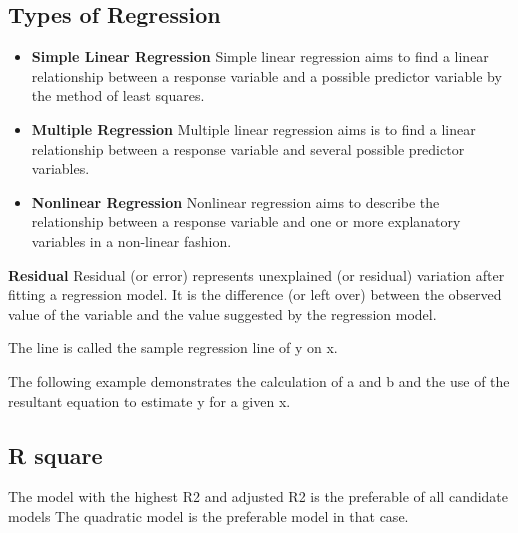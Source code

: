 \documentclass[]{report}
\begin{document}

\subsection{Types of Regression}

\begin{itemize}
	\item \textbf{Simple Linear Regression}
	Simple linear regression aims to find a linear relationship between a response variable and a possible predictor variable by the method of least squares.
	
	
	
	\item \textbf{Multiple Regression}
	Multiple linear regression aims is to find a linear relationship between a response variable and several possible predictor variables.
	
	
	
	\item \textbf{Nonlinear Regression}
	Nonlinear regression aims to describe the relationship between a response variable and one or more explanatory variables in a non-linear fashion.
\end{itemize}


\textbf{Residual}
Residual (or error) represents unexplained (or residual) variation after fitting a regression model.
It is the difference (or left over) between the observed value of the variable and the value suggested by the regression model.






The line is called the sample regression line of y on x.

The following example demonstrates the calculation of a and b and the use of the resultant
equation to estimate y for a given x.






\subsection{R square}
The model with the highest R2 and adjusted R2  is the preferable of all candidate models
The quadratic model is the preferable model in that case.
\end{document}
